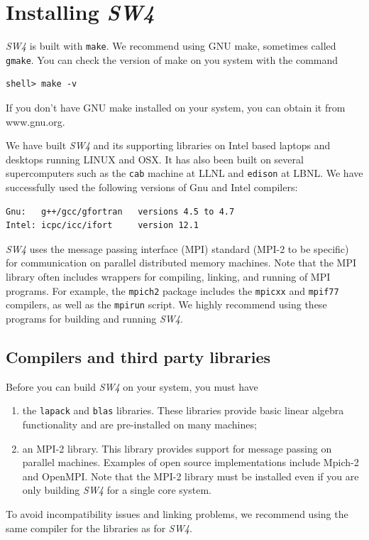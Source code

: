 \documentclass[11pt]{report}
\begin{document}
\chapter{Installing \emph{SW4}}\label{cha:installing-sw4}


\emph{SW4} is built with \verb+make+. We recommend using GNU make, sometimes called
\verb+gmake+. You can check the version of make on you system with the command
\begin{verbatim}
shell> make -v
\end{verbatim}
If you don't have GNU make installed on your system, you can obtain it from www.gnu.org.

We have built \emph{SW4} and its supporting libraries on Intel based laptops and desktops running
LINUX and OSX. It has also been built on several supercomputers such as the {\tt cab} machine at
LLNL and {\tt edison} at LBNL. We have successfully used the following versions of Gnu and Intel
compilers:
\begin{verbatim}
Gnu:   g++/gcc/gfortran   versions 4.5 to 4.7
Intel: icpc/icc/ifort     version 12.1
\end{verbatim}

\emph{SW4} uses the message passing interface (MPI) standard (MPI-2 to be specific) for
communication on parallel distributed memory machines. Note that the MPI library often includes
wrappers for compiling, linking, and running of MPI programs. For example, the {\tt mpich2} package
includes the {\tt mpicxx} and {\tt mpif77} compilers, as well as the {\tt mpirun} script. We highly
recommend using these programs for building and running \emph{SW4}.

\section{Compilers and third party libraries}

Before you can build \emph{SW4} on your system, you must have
\begin{enumerate}
\item the \verb+lapack+ and \verb+blas+ libraries. These libraries provide basic linear algebra
  functionality and are pre-installed on many machines;
\item an MPI-2 library. This library provides support for message passing on parallel
  machines. Examples of open source implementations include Mpich-2 and OpenMPI. Note that the MPI-2
  library must be installed even if you are only building \emph{SW4} for a single core system.
\end{enumerate}
To avoid incompatibility issues and linking problems, we recommend using the same compiler for
the libraries as for \emph{SW4}.
\end{document}
